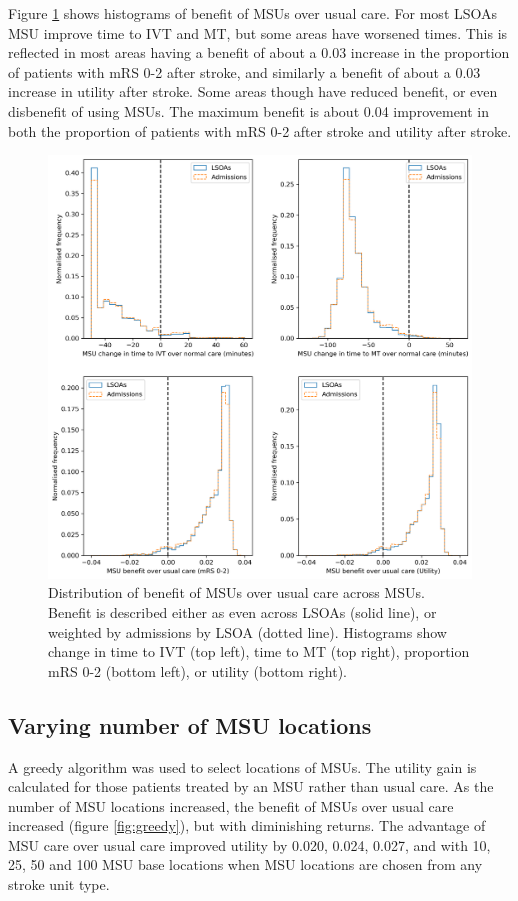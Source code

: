 Figure \ref{fig:msu_histograms} shows histograms of benefit of MSUs over usual care. For most LSOAs MSU improve time to IVT and MT, but some areas have worsened times. This is reflected in most areas having a benefit of about a 0.03 increase in the proportion of patients with mRS 0-2 after stroke, and similarly a benefit of about a 0.03 increase in utility after stroke. Some areas though have reduced benefit, or even disbenefit of using MSUs. The maximum benefit is about 0.04 improvement in both the proportion of patients with mRS 0-2 after stroke and utility after stroke.

\begin{figure}[h]
    \centering
    \includegraphics[width=0.75\linewidth]{images/histograms.png}
    \caption{Distribution of benefit of MSUs over usual care across MSUs. Benefit is described either as even across LSOAs (solid line), or weighted by admissions by LSOA (dotted line). Histograms show change in time to IVT (top left), time to MT (top right), proportion mRS 0-2 (bottom left), or utility (bottom right).}
    \label{fig:msu_histograms}
\end{figure}

\subsection{Varying number of MSU locations}

A greedy algorithm was used to select locations of MSUs. The utility gain is calculated for those patients treated by an MSU rather than usual care. As the number of MSU locations increased, the benefit of MSUs over usual care increased (figure \ref{fig:greedy}), but with diminishing returns. The advantage of MSU care over usual care improved utility by 0.020, 0.024, 0.027, and with 10, 25, 50 and 100 MSU base locations when MSU locations are chosen from any stroke unit type. 

